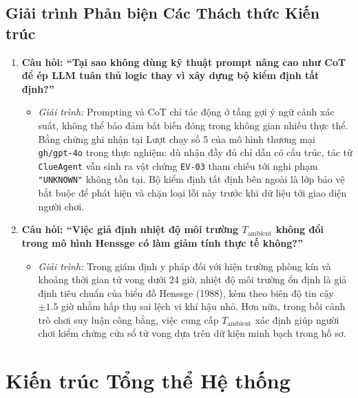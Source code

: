 \subsection{Giải trình Phản biện Các Thách thức Kiến trúc}
\begin{enumerate}[leftmargin=1.5cm]
    \item \textbf{Câu hỏi: ``Tại sao không dùng kỹ thuật prompt nâng cao như CoT để ép LLM tuân thủ logic thay vì xây dựng bộ kiểm định tất định?''}
    \begin{itemize}
        \item \textit{Giải trình:} Prompting và CoT chỉ tác động ở tầng gợi ý ngữ cảnh xác suất, không thể bảo đảm bất biến đóng trong không gian nhiều thực thể. Bằng chứng ghi nhận tại Lượt chạy số 5 của mô hình thương mại \texttt{gh/gpt-4o} trong thực nghiệm: dù nhận đầy đủ chỉ dẫn có cấu trúc, tác tử \texttt{ClueAgent} vẫn sinh ra vật chứng \texttt{EV-03} tham chiếu tới nghi phạm \texttt{"UNKNOWN"} không tồn tại. Bộ kiểm định tất định bên ngoài là lớp bảo vệ bắt buộc để phát hiện và chặn loại lỗi này trước khi dữ liệu tới giao diện người chơi.
    \end{itemize}
    
    \item \textbf{Câu hỏi: ``Việc giả định nhiệt độ môi trường $T_{\text{ambient}}$ không đổi trong mô hình Henssge có làm giảm tính thực tế không?''}
    \begin{itemize}
        \item \textit{Giải trình:} Trong giám định y pháp đối với hiện trường phòng kín và khoảng thời gian tử vong dưới 24 giờ, nhiệt độ môi trường ổn định là giả định tiêu chuẩn của biểu đồ Henssge (1988), kèm theo biên độ tin cậy $\pm 1.5$ giờ nhằm hấp thụ sai lệch vi khí hậu nhỏ. Hơn nữa, trong bối cảnh trò chơi suy luận công bằng, việc cung cấp $T_{\text{ambient}}$ xác định giúp người chơi kiểm chứng cửa sổ tử vong dựa trên dữ kiện minh bạch trong hồ sơ.
    \end{itemize}
\end{enumerate}

\section{Kiến trúc Tổng thể Hệ thống}
\label{sec:arch_overview}

